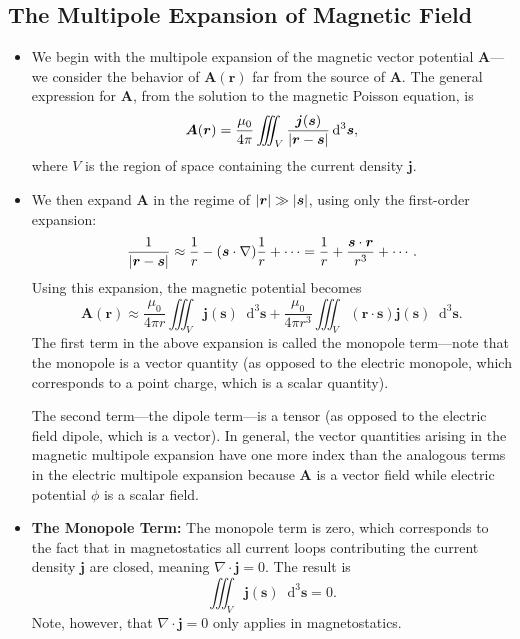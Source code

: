 \documentclass[11pt, a4paper]{article}
\newcommand{\diff}{\mathop{}\!\mathrm{d}} %
\renewcommand{\vec}[1]{\bm{#1}} %
\renewcommand{\r}{\vec{r}}
\newcommand{\A}{\vec{A}} %
\newcommand{\mm}{\mu_{0}}  %
\renewcommand{\j}{\vec{j}}  %
\newcommand{\s}{\vec{s}}  %
\newcommand{\ds}{\diff^{3} \s}  %
\renewcommand{\div}{\nabla \cdot}
\renewcommand{\grad}{\nabla}
\begin{document}
\subsection{The Multipole Expansion of Magnetic Field}
\begin{itemize}
	\item We begin with the multipole expansion of the magnetic vector potential $ \A $---we consider the behavior of $ \A(\r) $ far from the source of $ \A $. The general expression for $ \A $, from the solution to the magnetic Poisson equation, is
	\begin{equation*}
		\A(\r) = \frac{\mm}{4\pi}\iiint_{V}\frac{\j(\s)}{\abs{\r - \s}}\ds,
	\end{equation*}
	where $ V $ is the region of space containing the current density $ \j $. 
	
	\item We then expand $ \A $ in the regime of $ \abs{\r} \gg \abs{\s} $, using only the first-order expansion:
	\begin{equation*}
		\frac{1}{\abs{\r - \s}} \approx \frac{1}{r} - (\s \cdot \grad) \frac{1}{r} + \cdots = \frac{1}{r} + \frac{\s \cdot \r}{r^{3}} + \cdots.
	\end{equation*}
    Using this expansion, the magnetic potential becomes
	\begin{equation*}
		\A(\r) \approx \frac{\mm}{4\pi r}\iiint_{V} \j(\s) \ds + \frac{\mm}{4\pi r^{3}} \iiint_{V}(\r \cdot \s)\j(\s)\ds.
	\end{equation*}
	The first term in the above expansion is called the monopole term---note that the monopole is a vector quantity (as opposed to the electric monopole, which corresponds to a point charge, which is a scalar quantity).
	
	The second term---the dipole term---is a tensor (as opposed to the electric field dipole, which is a vector). In general, the vector quantities arising in the magnetic multipole expansion have one more index than the analogous terms in the electric multipole expansion because $ \A $ is a vector field while electric potential $ \phi $ is a scalar field.

    \item \textbf{The Monopole Term:} The monopole term is zero, which corresponds to the fact that in magnetostatics all current loops contributing the current density $ \j $ are closed, meaning $ \div \j = 0 $. The result is
	\begin{equation*}
		\iiint_{V} \j(\s) \ds = 0.
	\end{equation*}
    Note, however, that $ \div \j = 0 $ only applies in magnetostatics.


\end{itemize}
\end{document}
